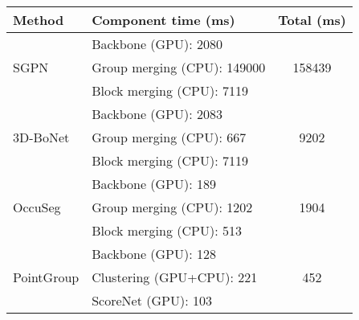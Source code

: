 \documentclass[10pt,twocolumn,letterpaper]{article}
\begin{document}
\begin{table}[t!]
\footnotesize
\setlength{\tabcolsep}{2pt}
\centering
\begin{tabular}{llc}
\toprule
\textbf{Method}  & \textbf{Component time} (ms) & \textbf{Total} (ms) \\ 
\midrule
\multirow{3}{*}{SGPN \cite{wang2018sgpn}} & Backbone (GPU): 2080 & \multirow{3}{*}{158439} \\
 &                      Group merging (CPU): 149000  &  \\
 &                      Block merging (CPU): 7119  &  \\
\midrule
\multirow{3}{*}{3D-BoNet \cite{hou20193d}} & Backbone (GPU): 2083 & \multirow{3}{*}{9202} \\
 &                      Group merging (CPU): 667  &  \\
 &                      Block merging (CPU): 7119  &  \\
\midrule
\multirow{3}{*}{OccuSeg \cite{han2020occuseg}} & Backbone (GPU): 189 & \multirow{3}{*}{1904} \\
 &                      Group merging (CPU): 1202  &  \\
 &                      Block merging (CPU): 513  &  \\
\midrule
\multirow{3}{*}{PointGroup \cite{jiang2020pointgroup}} & Backbone (GPU): 128 & \multirow{3}{*}{452} \\
 &                      Clustering (GPU+CPU): 221  &  \\
 &                      ScoreNet (GPU): 103  &  \\

\end{tabular}
\end{table}
\end{document}
